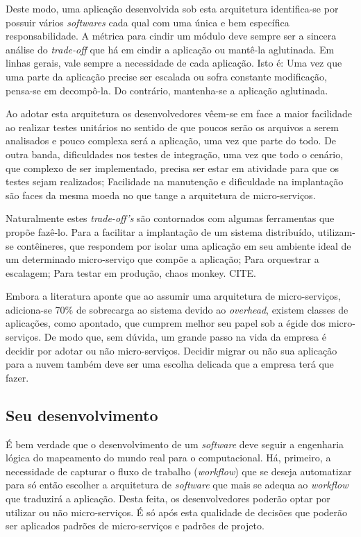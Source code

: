 Deste modo, uma aplicação desenvolvida sob esta arquitetura identifica-se por possuir vários \textit{softwares} cada qual com uma única e bem específica responsabilidade. A métrica para cindir um módulo deve sempre ser a sincera análise do \textit{trade-off} que há em cindir a aplicação ou mantê-la aglutinada. Em linhas gerais, vale sempre a necessidade de cada aplicação. Isto é: Uma vez que uma parte da aplicação precise ser escalada ou sofra constante modificação, pensa-se em decompô-la. Do contrário, mantenha-se a aplicação aglutinada.

Ao adotar esta arquitetura os desenvolvedores vêem-se em face a maior facilidade ao realizar testes unitários no sentido de que poucos serão os arquivos a serem analisados e pouco complexa será a aplicação, uma vez que parte do todo. De outra banda, dificuldades nos testes de integração, uma vez que todo o cenário, que complexo de ser implementado, precisa ser estar em atividade para que os testes sejam realizados; Facilidade na manutenção e dificuldade na implantação são faces da mesma moeda no que tange a arquitetura de micro-serviços.

Naturalmente estes \textit{trade-off's} são contornados com algumas ferramentas que propõe fazê-lo. Para a facilitar a implantação de um sistema distribuído, utilizam-se contêineres, que respondem por isolar uma aplicação em seu ambiente ideal de um determinado micro-serviço que compõe a aplicação; Para orquestrar a escalagem; Para testar em produção, chaos monkey. CITE.

Embora a literatura aponte que ao assumir uma arquitetura de micro-serviços, adiciona-se 70\% de sobrecarga ao sistema devido ao \textit{overhead}, existem classes de aplicações, como apontado, que cumprem melhor seu papel sob a égide dos micro-serviços. De modo que, sem dúvida, um grande passo na vida da empresa é decidir por adotar ou não micro-serviços. Decidir migrar ou não sua aplicação para a nuvem também deve ser uma escolha delicada que a empresa terá que fazer.

\subsection{Seu desenvolvimento}

É bem verdade que o desenvolvimento de um \textit{software} deve seguir a engenharia lógica do mapeamento do mundo real para o computacional. Há, primeiro, a necessidade de capturar o fluxo de trabalho (\textit{workflow}) que se deseja automatizar para só então escolher a arquitetura de \textit{software} que mais se adequa ao \textit{workflow} que traduzirá a aplicação. Desta feita, os desenvolvedores poderão optar por utilizar ou não micro-serviços. É só após esta qualidade de decisões que poderão ser aplicados padrões de micro-serviços e padrões de projeto.

